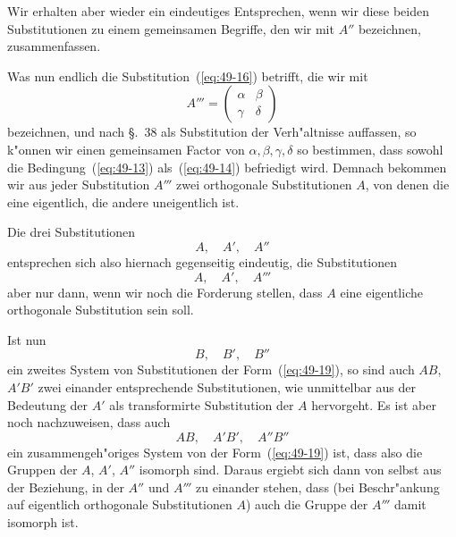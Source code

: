 \documentclass[12pt,a4paper]{article}
\theoremstyle{definition}
\begin{document}
Wir erhalten aber wieder ein eindeutiges Entsprechen, wenn wir diese beiden Substitutionen zu einem gemeinsamen Begriffe, den wir mit $A''$ bezeichnen, zusammenfassen.

Was nun endlich die Substitution~(\ref{eq:49-16}) betrifft, die wir mit
\begin{equation}\label{eq:49-18}
A''' = \begin{pmatrix} \alpha & \beta \\ \gamma & \delta \end{pmatrix}
\end{equation}
bezeichnen, und nach \S.~38 als Substitution der Verh"altnisse auffassen, so k"onnen wir einen gemeinsamen Factor von $\alpha, \beta, \gamma, \delta$ so bestimmen, dass sowohl die Bedingung~(\ref{eq:49-13}) als~(\ref{eq:49-14}) befriedigt wird. Demnach bekommen wir aus jeder Substitution $A'''$ zwei orthogonale Substitutionen $A$, von denen die eine eigentlich, die andere uneigentlich ist.

Die drei Substitutionen
\begin{equation}\label{eq:49-19}
A, \quad A', \quad A''
\end{equation}
entsprechen sich also hiernach gegenseitig eindeutig, die Substitutionen
\begin{equation}\label{eq:49-20}
A, \quad A', \quad A'''
\end{equation}
aber nur dann, wenn wir noch die Forderung stellen, dass $A$ eine eigentliche orthogonale Substitution sein soll.

Ist nun
\begin{equation}\label{eq:49-21}
B, \quad B', \quad B''
\end{equation}
ein zweites System von Substitutionen der Form~(\ref{eq:49-19}), so sind auch $AB$, $A'B'$ zwei einander entsprechende Substitutionen, wie unmittelbar aus der Bedeutung der $A'$ als transformirte Substitution der $A$ hervorgeht. Es ist aber noch nachzuweisen, dass auch
\begin{equation}\label{eq:49-22}
AB, \quad A'B', \quad A''B''
\end{equation}
ein zusammengeh"origes System von der Form~(\ref{eq:49-19}) ist, dass also die Gruppen der $A$, $A'$, $A''$ isomorph sind. Daraus ergiebt sich dann von selbst aus der Beziehung, in der $A''$ und $A'''$ zu einander stehen, dass (bei Beschr"ankung auf eigentlich orthogonale Substitutionen $A$) auch die Gruppe der $A'''$ damit isomorph ist.
\end{document}
